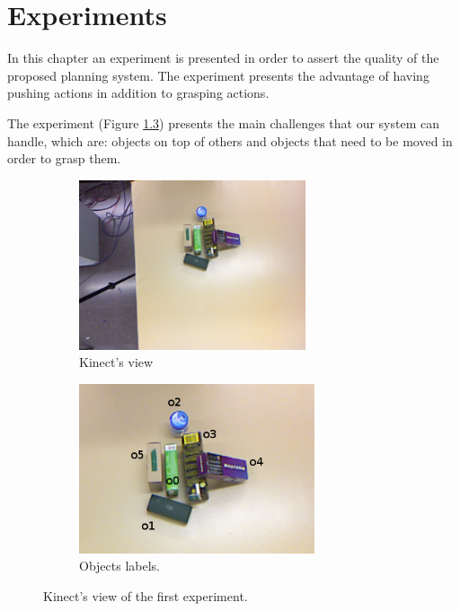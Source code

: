 \chapter{Experiments}
\label{ch:experiments}

In this chapter an experiment is presented in order to assert the quality of the proposed planning system. The experiment presents the advantage of having pushing actions in addition to grasping actions. 

The experiment (Figure \ref{fig:experiment_good}) presents the main challenges that our system can handle, which are: objects on top of others and objects that need to be moved in order to grasp them. 
\begin{figure}[tb]
\centering
\begin{subfigure}[t]{0.45\textwidth}
\centering
\includegraphics[height=5cm]{Img/experiments/image.png}
\caption{Kinect's view}\label{fig:experiment_good1}
\end{subfigure}
\begin{subfigure}[t]{0.45\textwidth}
\centering
\includegraphics[height=5cm]{Img/experiments/image_labels.png}
\caption{Objects labels.}\label{fig:experiment_good2}
\end{subfigure}
\caption{Kinect's view of the first experiment.}\label{fig:experiment_good}
\end{figure}


